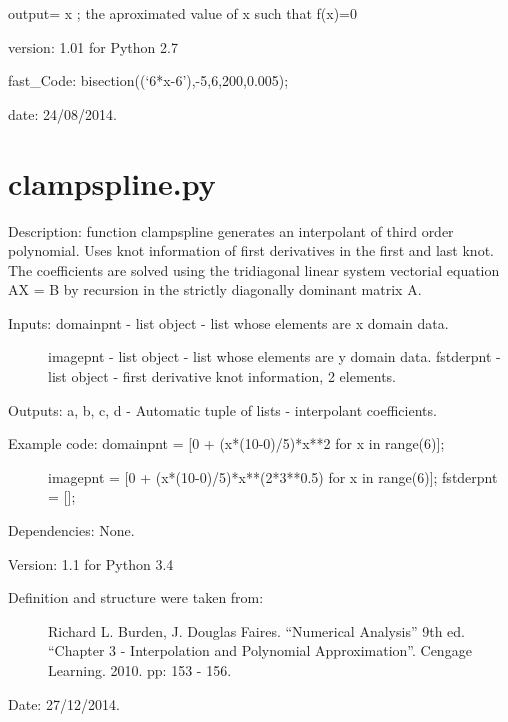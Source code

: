 \documentclass[letterpaper,10pt,oneside]{sphinxmanual}
\theoremstyle{plain}%
\theoremstyle{definition}%
\theoremstyle{remark}%
\begin{document}
output= x ; the aproximated value of x such that f(x)=0

version: 1.01 for Python 2.7

fast\_Code: bisection((`6*x-6'),-5,6,200,0.005);

date: 24/08/2014.


\section{clampspline.py}
\label{code:module-clampspline}\label{code:clampspline-py}
Description: function clampspline generates an interpolant of third order 
polynomial. Uses knot information of first derivatives in the first and last
knot. The coefficients are solved using the tridiagonal linear system 
vectorial equation AX = B by recursion in the strictly diagonally dominant 
matrix A.
\begin{description}
\item[{Inputs: domainpnt - list object - list whose elements are x domain data.}] \leavevmode
imagepnt - list object - list whose elements are y domain data.
fstderpnt - list object - first derivative knot information, 2 elements.

\end{description}

Outputs: a, b, c, d - Automatic tuple of lists - interpolant coefficients.
\begin{description}
\item[{Example code: domainpnt = {[}0 + (x*(10-0)/5)*x**2 for x in range(6){]};}] \leavevmode
imagepnt = {[}0 + (x*(10-0)/5)*x**(2*3**0.5) for x in range(6){]};
fstderpnt = {[}{]};

\end{description}

Dependencies: None.

Version: 1.1 for Python 3.4
\begin{description}
\item[{Definition and structure were taken from:}] \leavevmode
Richard L. Burden, J. Douglas Faires. ``Numerical Analysis'' 9th ed.
``Chapter 3 - Interpolation and Polynomial Approximation''. 
Cengage Learning. 2010. pp: 153 - 156.

\end{description}




Date: 27/12/2014.
\end{document}
